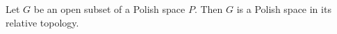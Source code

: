 Let $G$ be an open subset of a Polish space $P$. Then $G$ is a Polish space in its relative topology.

